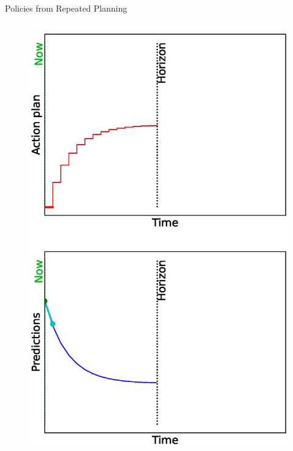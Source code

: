 \documentclass[lecture]{beamer}
\begin{document}
\begin{frame}{\normalsize Policies from Repeated Planning}
\footnotesize

\begin{columns}



  \begin{overlayarea}{\textwidth}{0.9\textheight}
    \begin{figure}
    \newcommand{\FS}{1}
      \centering
        {%
         \includegraphics[width=\FS\textwidth,clip]{Codes/MPC/MPC0.eps}
        }%
        {%
}
\end{figure}
\end{overlayarea}
\end{columns}
\end{frame}
\end{document}
